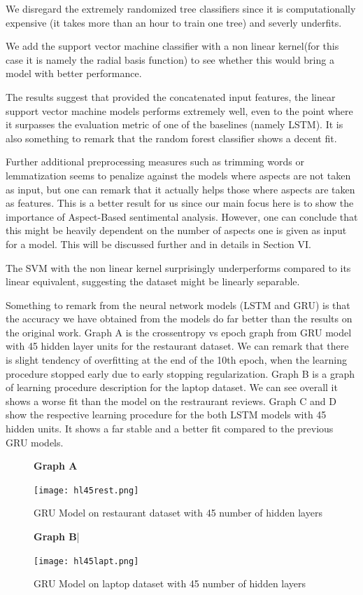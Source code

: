 \documentclass[comsoc,conference]{IEEEtran}
\begin{document}
We disregard the extremely randomized tree classifiers since it is computationally expensive (it takes more than an hour to train one tree) and severly underfits.

We add the support vector machine classifier with a non linear kernel(for this case it is namely the radial basis function) to see whether this would bring a model with better performance.

The results suggest that provided the concatenated input features, the linear support vector machine models performs extremely well, even to the point where it surpasses the evaluation metric of one of the baselines (namely LSTM). It is also something to remark that the random forest classifier shows a decent fit.

\par Further additional preprocessing measures such as trimming words or lemmatization seems to penalize against the models where aspects are not taken as input, but one can remark that it actually helps those where aspects are taken as features. This is a better result for us since our main focus here is to show the importance of Aspect-Based sentimental analysis. However, one can conclude that this might be heavily dependent on the number of aspects one is given as input for a model. This will be discussed further and in details in Section VI.

The SVM with the non linear kernel surprisingly underperforms compared to its linear equivalent, suggesting the dataset might be linearly separable.
\par Something to remark from the neural network models (LSTM and GRU) is that the accuracy we have obtained from the models do far better than the results on the original work. Graph A is the crossentropy vs epoch graph from GRU model with 45 hidden layer units for the restaurant dataset. We can remark that there is slight tendency of overfitting at the end of the 10th epoch, when the learning procedure stopped early due to early stopping regularization. Graph B  is a graph of learning procedure description for the laptop dataset. We can see overall it shows a worse fit than the model on the restraurant reviews. Graph C and D show the respective learning procedure for the both LSTM models with 45 hidden units. It shows a far stable and a better fit compared to the previous GRU models.

\newpage
\begin{figure}[hp]
\centering
\textbf{Graph A }\par\medskip
\caption{GRU Model on restaurant dataset with 45 number of hidden layers}
\texttt{[image: hl45rest.png]}
\end{figure}
\begin{figure}[hp]
\centering
\textbf{Graph B}|\par \medskip 
\caption{GRU Model on laptop dataset with 45 number of hidden layers}
\texttt{[image: hl45lapt.png]}
\end{figure}
\end{document}
